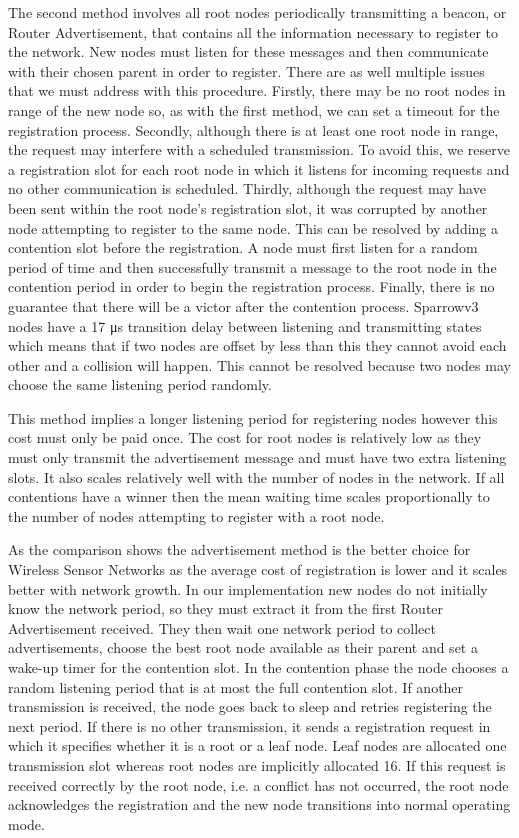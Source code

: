 The second method involves all root nodes periodically transmitting a beacon,
or Router Advertisement, that contains all the information necessary to
register to the network. New nodes must listen for these messages and then
communicate with their chosen parent in order to register.  There are as well
multiple issues that we must address with this procedure. Firstly, there may be
no root nodes in range of the new node so, as with the first method, we can set
a timeout for the registration process. Secondly, although there is at least
one root node in range, the request may interfere with a scheduled
transmission. To avoid this, we reserve a registration slot for each root node
in which it listens for incoming requests and no other communication is
scheduled. Thirdly, although the request may have been sent within the root
node's registration slot, it was corrupted by another node attempting to
register to the same node. This can be resolved by adding a contention slot
before the registration. A node must first listen for a random period of time
and then successfully transmit a message to the root node in the contention
period in order to begin the registration process. Finally, there is no
guarantee that there will be a victor after the contention process. Sparrowv3
nodes have a 17 μs transition delay between listening and transmitting states
which means that if two nodes are offset by less than this they cannot avoid
each other and a collision will happen. This cannot be resolved because two
nodes may choose the same listening period randomly.

This method implies a longer listening period for registering nodes however
this cost must only be paid once. The cost for root nodes is relatively low as
they must only transmit the advertisement message and must have two extra
listening slots. It also scales relatively well with the number of nodes in the
network.  If all contentions have a winner then the mean waiting time scales
proportionally to the number of nodes attempting to register with a root node. 

\vspace{\baselineskip}

As the comparison shows the advertisement method is the better choice for
Wireless Sensor Networks as the average cost of registration is lower and it
scales better with network growth. In our implementation new nodes do not
initially know the network period, so they must extract it from the first
Router Advertisement received. They then wait one network period to collect
advertisements, choose the best root node available as their parent and set a
wake-up timer for the contention slot. In the contention phase the node chooses
a random listening period that is at most the full contention slot. If another
transmission is received, the node goes back to sleep and retries registering
the next period. If there is no other transmission, it sends a registration
request in which it specifies whether it is a root or a leaf node.  Leaf nodes
are allocated one transmission slot whereas root nodes are implicitly allocated
16. If this request is received correctly by the root node, i.e. a conflict has
not occurred, the root node acknowledges the registration and the new node
transitions into normal operating mode.

